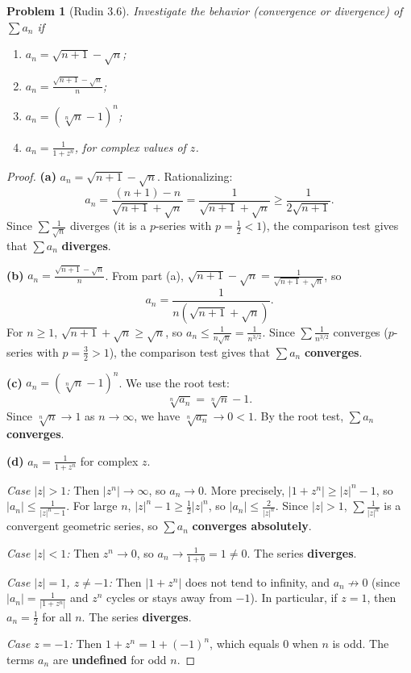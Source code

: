 \documentclass[12 pt]{article}        	%
\newtheorem{prob}{Problem}
\begin{document}
\begin{prob}[Rudin 3.6]
Investigate the behavior (convergence or divergence) of $\sum a_n$ if

\begin{enumerate}
    \item[(a)] $a_n = \sqrt{n+1} - \sqrt{n}$;
    \item[(b)] $\displaystyle a_n = \frac{\sqrt{n+1} - \sqrt{n}}{n}$;
    \item[(c)] $a_n = (\sqrt[n]{n} - 1)^n$;
    \item[(d)] $\displaystyle a_n = \frac{1}{1 + z^n}$, for complex values of $z$.
\end{enumerate}
\end{prob}
\begin{proof}
\textbf{(a)} $a_n = \sqrt{n+1} - \sqrt{n}$. Rationalizing:
\[
a_n = \frac{(n+1) - n}{\sqrt{n+1} + \sqrt{n}} = \frac{1}{\sqrt{n+1} + \sqrt{n}} \geq \frac{1}{2\sqrt{n+1}}.
\]
Since $\sum \frac{1}{\sqrt{n}}$ diverges (it is a $p$-series with $p = \frac{1}{2} < 1$), the comparison test gives that $\sum a_n$ \textbf{diverges}.

\textbf{(b)} $\displaystyle a_n = \frac{\sqrt{n+1} - \sqrt{n}}{n}$. From part (a), $\sqrt{n+1} - \sqrt{n} = \frac{1}{\sqrt{n+1}+\sqrt{n}}$, so
\[
a_n = \frac{1}{n(\sqrt{n+1} + \sqrt{n})}.
\]
For $n \geq 1$, $\sqrt{n+1} + \sqrt{n} \geq \sqrt{n}$, so $a_n \leq \frac{1}{n\sqrt{n}} = \frac{1}{n^{3/2}}$. Since $\sum \frac{1}{n^{3/2}}$ converges ($p$-series with $p = \frac{3}{2} > 1$), the comparison test gives that $\sum a_n$ \textbf{converges}.

\textbf{(c)} $a_n = (\sqrt[n]{n} - 1)^n$. We use the root test:
\[
\sqrt[n]{a_n} = \sqrt[n]{n} - 1.
\]
Since $\sqrt[n]{n} \to 1$ as $n \to \infty$, we have $\sqrt[n]{a_n} \to 0 < 1$. By the root test, $\sum a_n$ \textbf{converges}.

\textbf{(d)} $\displaystyle a_n = \frac{1}{1 + z^n}$ for complex $z$.

\textit{Case $|z| > 1$:} Then $|z^n| \to \infty$, so $a_n \to 0$. More precisely, $|1 + z^n| \geq |z|^n - 1$, so $|a_n| \leq \frac{1}{|z|^n - 1}$. For large $n$, $|z|^n - 1 \geq \frac{1}{2}|z|^n$, so $|a_n| \leq \frac{2}{|z|^n}$. Since $|z| > 1$, $\sum \frac{1}{|z|^n}$ is a convergent geometric series, so $\sum a_n$ \textbf{converges absolutely}.

\textit{Case $|z| < 1$:} Then $z^n \to 0$, so $a_n \to \frac{1}{1+0} = 1 \neq 0$. The series \textbf{diverges}.

\textit{Case $|z| = 1$, $z \neq -1$:} Then $|1 + z^n|$ does not tend to infinity, and $a_n \not\to 0$ (since $|a_n| = \frac{1}{|1+z^n|}$ and $z^n$ cycles or stays away from $-1$). In particular, if $z = 1$, then $a_n = \frac{1}{2}$ for all $n$. The series \textbf{diverges}.

\textit{Case $z = -1$:} Then $1 + z^n = 1 + (-1)^n$, which equals $0$ when $n$ is odd. The terms $a_n$ are \textbf{undefined} for odd $n$.
\end{proof}
\end{document}

